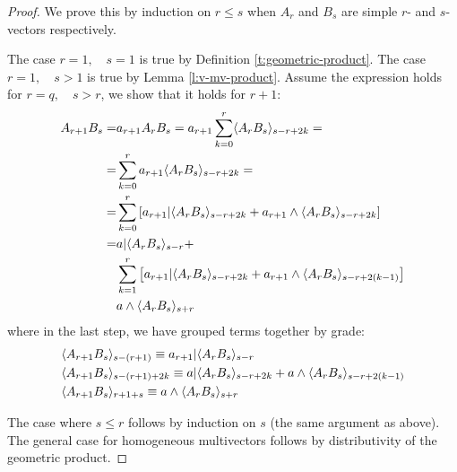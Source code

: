 \begin{proof}
	We prove this by induction on $r \leq s$ when $A_r$ and $B_s$ are simple $r$- and $s$-vectors respectively.

	The case $r=1,\quad s=1$ is true by Definition \ref{t:geometric-product}.
	The case $r=1,\quad s>1$ is true by Lemma \ref{l:v-mv-product}.
	Assume the expression holds for $r = q,\quad s > r$, we show that it holds for $r+1$:
	\begin{align*}
		A_{r+1}B_s = &a_{r+1}A_rB_s = a_{r+1}\sum_{k=0}^r \langle A_rB_s \rangle_{s-r+2k} = \\
		= &\sum_{k=0}^r a_{r+1}\langle A_rB_s \rangle_{s-r+2k} = \\
		= &\sum_{k=0}^r \left[a_{r+1} | \langle A_rB_s \rangle_{s-r+2k} + a_{r+1} \wedge \langle A_rB_s \rangle_{s-r+2k}\right]\\
		= &a | \langle A_rB_s \rangle_{s-r} + \\
		  &\sum_{k=1}^r \left[a_{r+1} | \langle A_rB_s \rangle_{s-r+2k} + a_{r+1} \wedge \langle A_rB_s \rangle_{s-r+2(k-1)}\right]\\
		  &a\wedge \langle A_rB_s \rangle_{s+r}
	\end{align*}
	where in the last step, we have grouped terms together by grade:
	\begin{align*}
		&\langle A_{r+1}B_s \rangle_{s-(r+1)} \equiv a_{r+1} | \langle A_rB_s \rangle_{s-r} \\
		&\langle A_{r+1}B_s \rangle_{s-(r+1)+2k} \equiv a | \langle A_rB_s \rangle_{s-r+2k} + a \wedge \langle A_rB_s \rangle_{s-r+2(k-1)} \\
		&\langle A_{r+1}B_s \rangle_{r+1+s} \equiv a \wedge \langle A_rB_s \rangle_{s+r}
	\end{align*}

	The case where $s \leq r$ follows by induction on $s$ (the same argument as above).
	The general case for homogeneous multivectors follows by distributivity of the geometric product.
\end{proof}
